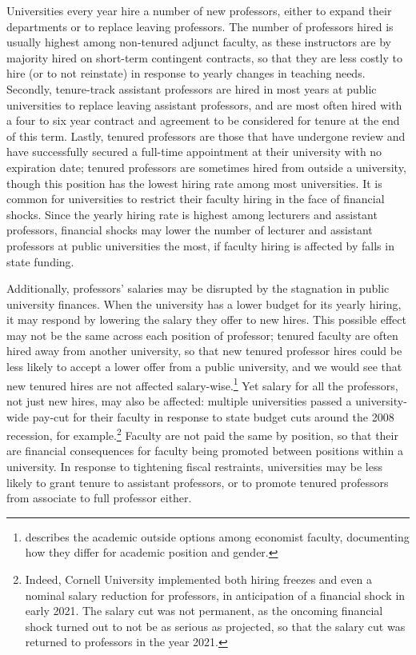 \documentclass[notitlepage,12pt]{article}
\begin{document}
Universities every year hire a number of new professors, either to expand their departments or to replace leaving professors.
The number of professors hired is usually highest among non-tenured adjunct faculty, as these instructors are by majority hired on short-term contingent contracts, so that they are less costly to hire (or to not reinstate) in response to yearly changes in teaching needs.
Secondly, tenure-track assistant professors are hired in most years at public universities to replace leaving assistant professors, and are most often hired with a four to six year contract and agreement to be considered for tenure at the end of this term.
Lastly, tenured professors are those that have undergone review and have successfully secured a full-time appointment at their university with no expiration date; tenured professors are sometimes hired from outside a university, though this position has the lowest hiring rate among most universities.
It is common for universities to restrict their faculty hiring in the face of financial shocks.
Since the yearly hiring rate is highest among lecturers and assistant professors, financial shocks may lower the number of lecturer and assistant professors at public universities the most, if faculty hiring is affected by falls in state funding.

Additionally, professors' salaries may be disrupted by the stagnation in public university finances.
When the university has a lower budget for its yearly hiring, it may respond by lowering the salary they offer to new hires.
This possible effect may not be the same across each position of professor; tenured faculty are often hired away from another university, so that new tenured professor hires could be less likely to accept a lower offer from a public university, and we would see that new tenured hires are not affected salary-wise.\footnote{
    \cite{blackaby2005} describes the academic outside options among economist faculty, documenting how they differ for academic position and gender.
}
Yet salary for all the professors, not just new hires, may also be affected: multiple universities passed a university-wide pay-cut for their faculty in response to state budget cuts around the 2008 recession, for example.\footnote{
    Indeed, Cornell University implemented both hiring freezes and even a nominal salary reduction for professors, in anticipation of a financial shock in early 2021.
    The salary cut was not permanent, as the oncoming financial shock turned out to not be as serious as projected, so that the salary cut was returned to professors in the year 2021.
}
Faculty are not paid the same by position, so that their are financial consequences for faculty being promoted between positions within a university.
In response to tightening fiscal restraints, universities may be less likely to grant tenure to assistant professors, or to promote tenured professors from associate to full professor either.
\end{document}
